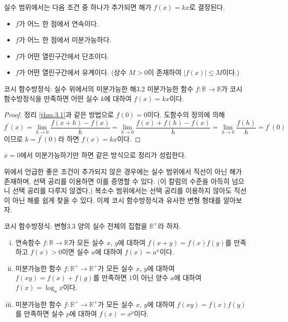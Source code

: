 \documentclass{article}
\begin{document}
실수 범위에서는 다음 조건 중 하나가 추가되면 해가 $f(x)=kx$로 결정된다.

\begin{itemize}
	\item $f$가 어느 한 점에서 연속이다.
	\item $f$가 어느 한 점에서 미분가능하다.
	\item $f$가 어떤 열린구간에서 단조이다.
	\item $f$가 어떤 열린구간에서 유계이다. (상수 $M>0$이 존재하여 $\vert f(x)\vert\leq M$이다.)
\end{itemize}

\begin{thm}{코시 함수방정식: 실수 위에서의 미분가능한 해}{3.2}
	미분가능한 함수 $f:\mathbb R\to\mathbb R$가 코시 함수방정식을 만족하면 어떤 실수 $k$에 대하여 $f(x)=kx$이다.
\end{thm}

\begin{proof}
	 정리 \ref{thm:3.1}과 같은 방법으로 $f(0)=0$이다. 도함수의 정의에 의해
	 \[
	 	f^\prime(x)=\lim\limits_{h\to0}\frac{f(x+h)-f(x)}{h}=\lim\limits_{h\to0}\frac{f(x)+f(h)-f(x)}{h}=\lim\limits_{h\to0}\frac{f(h)}{h}=f^\prime(0)
	 \]
	 이므로 $k=f^\prime(0)$라 하면 $f(x)=kx$이다.
\end{proof}

\begin{remark}
	$x=0$에서 미분가능하기만 하면 같은 방식으로 정리가 성립한다.
\end{remark}

위에서 언급한 좋은 조건이 추가되지 않은 경우에는 실수 범위에서 직선이 아닌 해가 존재하며, 선택 공리를 이용하면 이를 증명할 수 있다. (이 칼럼의 수준을 아득히 넘으니 선택 공리를 다루지 않겠다.) 복소수 범위에서는 선택 공리를 이용하지 않아도 직선이 아닌 해를 쉽게 찾을 수 있다. 이제 코시 함수방정식과 유사한 변형 형태를 알아보자.

\begin{thm}{코시 함수방정식: 변형}{3.3}
	양의 실수 전체의 집합을 $\mathbb R^+$라 하자.
	\begin{enumerate}[(i)]
		\item 연속함수 $f:\mathbb R\to\mathbb R$가 모든 실수 $x$, $y$에 대하여 $f(x+y)=f(x)f(y)$를 만족하고 $f(x)>0$이면 실수 $a$에 대하여 $f(x)=a^x$이다.
		\item 미분가능한 함수 $f:\mathbb R^+\to\mathbb R^+$가 모든 실수 $x$, $y$에 대하여 $f(xy)=f(x)+f(y)$를 만족하면 $1$이 아닌 양수 $a$에 대하여 $f(x)=\log_ax$이다.
		\item 미분가능한 함수 $f:\mathbb R^+\to\mathbb R^+$가 모든 실수 $x$, $y$에 대하여 $f(xy)=f(x)f(y)$를 만족하면 실수 $p$에 대하여 $f(x)=x^p$이다.
	\end{enumerate}
\end{thm}
\end{document}
